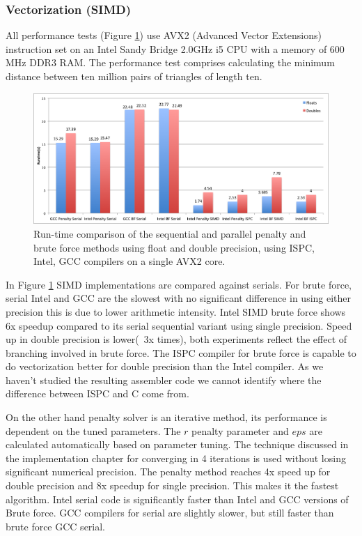 \documentclass[times,12pt]{article}
\begin{document}
\subsubsection{Vectorization (SIMD)}

All performance tests (Figure \ref{fig17}) use AVX2 (Advanced Vector Extensions) instruction set on an Intel Sandy Bridge 2.0GHz i5 CPU with a memory of 600 MHz DDR3 RAM. The performance test comprises calculating the minimum distance between ten million pairs of triangles of length ten.

\begin{figure}[!h]
\centering
\includegraphics[width=1\textwidth]{perf} \protect\caption{\label{fig17}Run-time comparison of the sequential and parallel penalty and brute force methods using float and double precision, using ISPC, Intel, GCC compilers on a single AVX2 core.}
\end{figure} 

In Figure \ref{fig17} SIMD implementations are compared against serials. For brute force, serial Intel and GCC are the slowest with no significant difference in using either precision this is due to lower arithmetic intensity. Intel SIMD  brute force shows 6x speedup compared to its serial sequential variant using single precision. Speed up in double precision is lower(~3x times), both experiments reflect the effect of branching involved in brute force. The ISPC compiler for brute force is capable to do vectorization better for double precision than the Intel compiler. As we haven't studied the resulting assembler code we cannot identify where the difference between ISPC and C come from.

On the other hand penalty solver is an iterative method, its performance is dependent on the tuned parameters. The $r$ penalty parameter and $eps$ are calculated automatically based on parameter tuning. The technique discussed in the implementation chapter for converging in 4 iterations is used without losing significant numerical precision. The penalty method reaches 4x speed up for double precision and 8x speedup for single precision. This makes it the fastest algorithm. Intel serial code is significantly faster than Intel and GCC versions of Brute force. GCC compilers for serial are slightly slower, but still faster than brute force GCC serial. 
\end{document}
